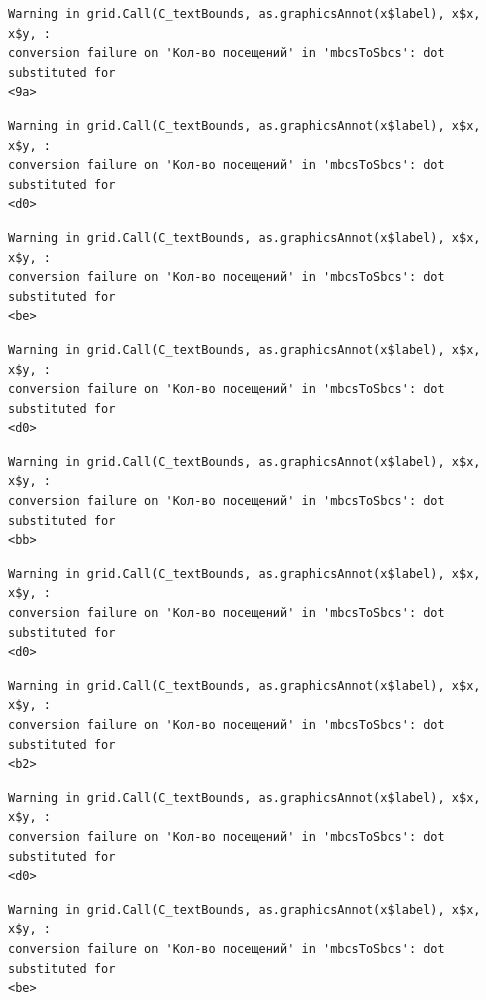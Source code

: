 \documentclass[
  letterpaper,
  DIV=11,
  numbers=noendperiod]{scrartcl}
\begin{document}
\begin{verbatim}
Warning in grid.Call(C_textBounds, as.graphicsAnnot(x$label), x$x, x$y, :
conversion failure on 'Кол-во посещений' in 'mbcsToSbcs': dot substituted for
<9a>
\end{verbatim}

\begin{verbatim}
Warning in grid.Call(C_textBounds, as.graphicsAnnot(x$label), x$x, x$y, :
conversion failure on 'Кол-во посещений' in 'mbcsToSbcs': dot substituted for
<d0>
\end{verbatim}

\begin{verbatim}
Warning in grid.Call(C_textBounds, as.graphicsAnnot(x$label), x$x, x$y, :
conversion failure on 'Кол-во посещений' in 'mbcsToSbcs': dot substituted for
<be>
\end{verbatim}

\begin{verbatim}
Warning in grid.Call(C_textBounds, as.graphicsAnnot(x$label), x$x, x$y, :
conversion failure on 'Кол-во посещений' in 'mbcsToSbcs': dot substituted for
<d0>
\end{verbatim}

\begin{verbatim}
Warning in grid.Call(C_textBounds, as.graphicsAnnot(x$label), x$x, x$y, :
conversion failure on 'Кол-во посещений' in 'mbcsToSbcs': dot substituted for
<bb>
\end{verbatim}

\begin{verbatim}
Warning in grid.Call(C_textBounds, as.graphicsAnnot(x$label), x$x, x$y, :
conversion failure on 'Кол-во посещений' in 'mbcsToSbcs': dot substituted for
<d0>
\end{verbatim}

\begin{verbatim}
Warning in grid.Call(C_textBounds, as.graphicsAnnot(x$label), x$x, x$y, :
conversion failure on 'Кол-во посещений' in 'mbcsToSbcs': dot substituted for
<b2>
\end{verbatim}

\begin{verbatim}
Warning in grid.Call(C_textBounds, as.graphicsAnnot(x$label), x$x, x$y, :
conversion failure on 'Кол-во посещений' in 'mbcsToSbcs': dot substituted for
<d0>
\end{verbatim}

\begin{verbatim}
Warning in grid.Call(C_textBounds, as.graphicsAnnot(x$label), x$x, x$y, :
conversion failure on 'Кол-во посещений' in 'mbcsToSbcs': dot substituted for
<be>
\end{verbatim}
\end{document}
